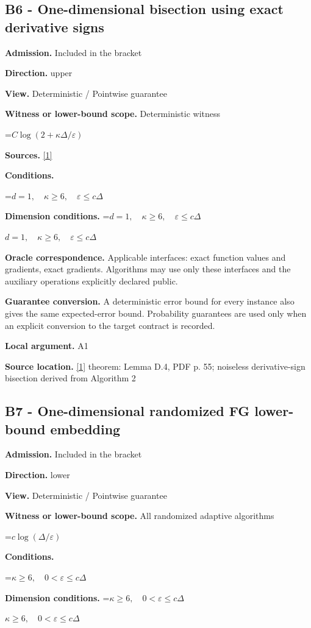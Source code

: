\documentclass[10pt,a4paper]{article}
\newcommand{\AtlasMath}[1]{\par\begingroup\centering\setbox0=\hbox{$\displaystyle #1$}\ifdim\wd0>1.4\linewidth\typeout{ATLAS WIDE FORMULA: \the\wd0}\fi\ifdim\wd0>\linewidth\resizebox{\linewidth}{!}{\box0}\else\box0\fi\par\endgroup}
\newcommand{\AtlasInlineMath}[1]{\begingroup\setbox0=\hbox{$#1$}\ifdim\wd0>.4\linewidth\endgroup\AtlasMath{#1}\else\endgroup$#1$\fi}
\begin{document}
\subsection{B6 - One-dimensional bisection using exact derivative signs}
\textbf{Admission.} Included in the bracket

\textbf{Direction.} upper

\textbf{View.} Deterministic / Pointwise guarantee

\textbf{Witness or lower-bound scope.} Deterministic witness

\AtlasMath{C\log(2+\kappa\Delta/\varepsilon)}
\textbf{Sources.} \href{https://arxiv.org/pdf/2609.03990}{[1]}

\textbf{Conditions.} 
\AtlasMath{d=1,\quad\kappa\ge6,\quad\varepsilon\le c\Delta}


\textbf{Dimension conditions.} \AtlasInlineMath{d=1,\quad\kappa\ge6,\quad\varepsilon\le c\Delta}

\textbf{Oracle correspondence.} Applicable interfaces: exact function values and gradients, exact gradients. Algorithms may use only these interfaces and the auxiliary operations explicitly declared public.

\textbf{Guarantee conversion.} A deterministic error bound for every instance also gives the same expected-error bound. Probability guarantees are used only when an explicit conversion to the target contract is recorded.

\textbf{Local argument.} A1

\textbf{Source location.} \href{https://arxiv.org/pdf/2609.03990}{[1]} theorem: Lemma D.4, PDF p. 55; noiseless derivative-sign bisection derived from Algorithm 2

\subsection{B7 - One-dimensional randomized FG lower-bound embedding}
\textbf{Admission.} Included in the bracket

\textbf{Direction.} lower

\textbf{View.} Deterministic / Pointwise guarantee

\textbf{Witness or lower-bound scope.} All randomized adaptive algorithms

\AtlasMath{c\log(\Delta/\varepsilon)}
\textbf{Conditions.} 
\AtlasMath{\kappa\ge6,\quad0<\varepsilon\le c\Delta}


\textbf{Dimension conditions.} \AtlasInlineMath{\kappa\ge6,\quad0<\varepsilon\le c\Delta}
\end{document}

